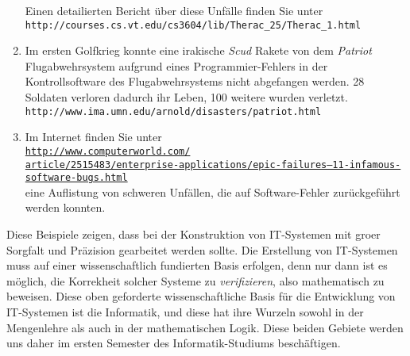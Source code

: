\begin{enumerate}
      Einen detailierten Bericht \"{u}ber diese Unf\"{a}lle finden Sie unter \\[0.1cm]
      \hspace*{1.3cm} \texttt{http://courses.cs.vt.edu/cs3604/lib/Therac\_25/Therac\_1.html}      
\item Im ersten Golfkrieg konnte eine irakische \textsl{Scud} Rakete von dem \textsl{Patriot} Flugabwehrsystem
      aufgrund eines Programmier-Fehlers in der Kontrollsoftware des Flugabwehrsystems
      nicht abgefangen werden.  28 Soldaten verloren dadurch ihr Leben, 100 weitere wurden
      verletzt. \\[0.1cm]
      \hspace*{1.3cm} \texttt{http://www.ima.umn.edu/arnold/disasters/patriot.html}
\item Im Internet finden Sie unter \\[0.1cm]
      \hspace*{1.3cm}
      \href{http://www.computerworld.com/article/2515483/enterprise-applications/epic-failures--11-infamous-software-bugs.html}{\texttt{http://www.computerworld.com/\\
              article/2515483/enterprise-applications/epic-failures--11-infamous-software-bugs.html}}
      \\[0.1cm]
      eine Auflistung von schweren Unf\"{a}llen, die auf Software-Fehler zur\"{u}ckgef\"{u}hrt werden konnten.
\end{enumerate}
Diese Beispiele zeigen, dass bei der Konstruktion von IT-Systemen mit gro\3er Sorgfalt
und Pr\"{a}zision gearbeitet werden sollte.  Die Erstellung von IT-Systemen muss auf einer 
wissenschaftlich fundierten Basis erfolgen, denn nur dann ist es m\"{o}glich, die Korrekheit
solcher Systeme zu \emph{verifizieren}, also mathematisch zu beweisen.
Diese oben geforderte wissenschaftliche Basis f\"{u}r die Entwicklung von IT-Systemen ist die Informatik, 
und diese hat ihre Wurzeln sowohl in der Mengenlehre als auch in der mathematischen
Logik.  Diese beiden Gebiete werden uns daher im ersten Semester
des Informatik-Studiums besch\"{a}ftigen.

